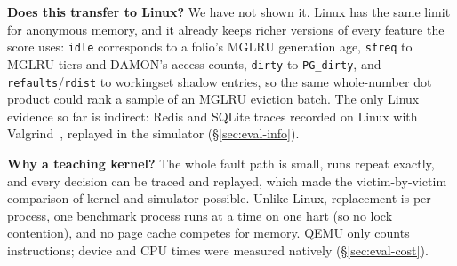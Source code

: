 \documentclass{article}
\newcommand{\feat}[1]{\texttt{#1}}         %
\newcommand{\finding}[1]{\textbf{#1}\hspace{0.4em}}
\begin{document}
\finding{Does this transfer to Linux?} We have not shown it. Linux has the same limit for
anonymous memory, and it already keeps richer versions of every feature the score uses:
\feat{idle} corresponds to a folio's MGLRU generation age, \feat{sfreq} to MGLRU tiers and
DAMON's access counts, \feat{dirty} to \texttt{PG\_dirty}, and
\feat{refaults}/\feat{rdist} to workingset shadow entries, so the same whole-number dot
product could rank a sample of an MGLRU eviction batch. The only Linux evidence so far is
indirect: Redis and SQLite traces recorded on Linux with
Valgrind~\citep{nethercote2007valgrind}, replayed in the simulator (\S\ref{sec:eval-info}).

\finding{Why a teaching kernel?} The whole fault path is small, runs repeat exactly, and
every decision can be traced and replayed, which made the victim-by-victim comparison of
kernel and simulator possible. Unlike Linux, replacement is per process, one benchmark
process runs at a time on one hart (so no lock contention), and no page cache competes for
memory. QEMU only counts instructions; device and CPU times were measured natively
(\S\ref{sec:eval-cost}).
\end{document}
